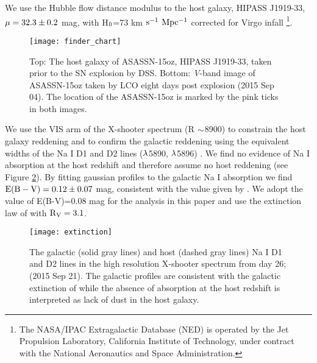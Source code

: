 \documentclass[a4paper,fleqn,usenatbib]{mnras}
\begin{document}
We use the Hubble flow distance modulus to the host galaxy, HIPASS J1919-33,  $\rm{\mu=32.3\pm 0.2}$ mag, with H$\rm{_{0}}$=73 km $\rm{s^{-1}}$ $\rm{Mpc^{-1} }$ corrected for Virgo infall
\footnote{The NASA/IPAC Extragalactic Database (NED) is operated by the Jet Propulsion Laboratory, California Institute of Technology, under contract with the National Aeronautics and Space Administration.}.
\begin{figure}
\begin{center}
\texttt{[image: finder\_chart]} %
\caption{Top: The host galaxy of ASASSN-15oz, HIPASS J1919-33, taken prior to the SN explosion by DSS. 
Bottom: {\it V}-band image of ASASSN-15oz taken by LCO eight days post explosion (2015 Sep 04).
The location of the ASASSN-15oz is marked by the pink ticks in both images.}
\label{fig:finder}
\end{center}
\end{figure}
We use the VIS arm of the X-shooter spectrum (R $\rm{\sim}$8900) to constrain the host galaxy reddening and to confirm the galactic reddening using the equivalent widths of the Na I D1 and D2 lines ($\rm{\lambda}$5890, $\rm{\lambda}$5896) \citep{2012poznanski}. 
We find no evidence of Na I absorption at the host redshift and therefore assume no host reddening (see Figure \ref{fig:extinction}). 
By fitting gaussian profiles to the galactic Na I absorption we find $\rm{E(B-V) = 0.12\pm0.07}$ mag, consistent with the value given by \citet{2011schlafly}. 
We adopt the \citet{2011schlafly}  value of E(B-V)=0.08 mag for the analysis in this paper and use the extinction law of \citet{1989cardelli} with $\rm{R_{V} = 3.1}$. 
\begin{figure}
\begin{center}
\texttt{[image: extinction]} %
\caption{The galactic (solid gray lines) and host (dashed gray lines) Na I D1 and D2 lines in the high resolution X-shooter spectrum from day 26; (2015 Sep 21).
The galactic profiles are consistent with the galactic extinction of \citet{2011schlafly} while the absence of absorption at the host redshift is interpreted as lack of dust in the host galaxy. }
\label{fig:extinction}
\end{center}
\end{figure}
\end{document}
